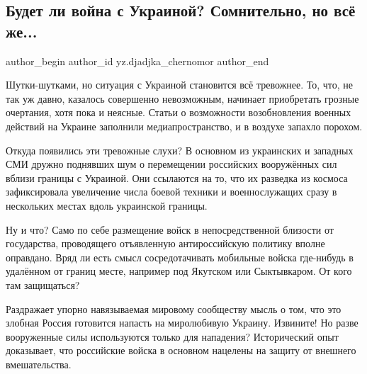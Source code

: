  
 
 
 
 
 
\subsection{Будет ли война с Украиной? Сомнительно, но всё же...}
\label{sec:28_12_2021.yz.djadjka_chernomor.1.vojna_s_ukrainoj}
 
\ifcmt
 author_begin
   author_id yz.djadjka_chernomor
 author_end
\fi

Шутки-шутками, но ситуация с Украиной становится всё тревожнее. То, что, не так
уж давно, казалось совершенно невозможным, начинает приобретать грозные
очертания, хотя пока и неясные. Статьи о возможности возобновления военных
действий на Украине заполнили медиапространство, и в воздухе запахло порохом.


Откуда появились эти тревожные слухи? В основном из украинских и западных СМИ
дружно поднявших шум о перемещении российских вооружённых сил вблизи границы с
Украиной. Они ссылаются на то, что их разведка из космоса зафиксировала
увеличение числа боевой техники и военнослужащих сразу в нескольких местах
вдоль украинской границы.

Ну и что? Само по себе размещение войск в непосредственной близости от
государства, проводящего отъявленную антироссийскую политику вполне оправдано.
Вряд ли есть смысл сосредотачивать мобильные войска где-нибудь в удалённом от
границ месте, например под Якутском или Сыктывкаром. От кого там защищаться?

Раздражает упорно навязываемая мировому сообществу мысль о том, что это злобная
Россия готовится напасть на миролюбивую Украину. Извините! Но разве вооруженные
силы используются только для нападения? Исторический опыт доказывает, что
российские войска в основном нацелены на защиту от внешнего вмешательства.


